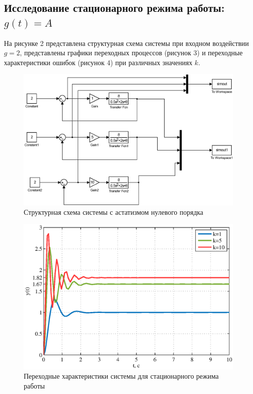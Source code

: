 \documentclass[a4paper,12pt]{article} %
\begin{document}
\subsection{Исследование стационарного режима работы: $g(t)=A$} 
На рисунке 2 представлена структурная схема системы при входном воздействии \\$g=2$, представлены графики переходных процессов (рисунок 3) и переходные характеристики ошибок (рисунок 4) при различных значениях $k$. 
\begin{figure}[h!]
	\centering
	\includegraphics[width=1\linewidth]{scheme/scheme1.eps}
	\caption{Структурная схема системы с астатизмом нулевого порядка}
\end{figure}
\begin{figure}[H]
	\centering
	\includegraphics[width=1\linewidth]{scheme/plot1.eps}
	\caption{Переходные характеристики системы для стационарного режима работы}
\end{figure}
\end{document}
